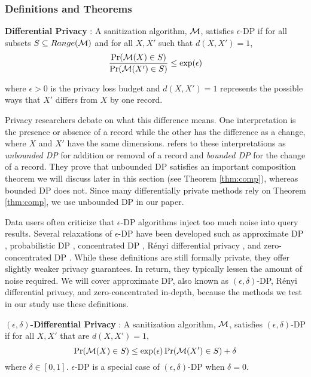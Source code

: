 \subsubsection{Definitions and Theorems}\label{subsec:def}
\begin{defn}\label{def:dp} \textbf{Differential Privacy} \autocite{dwork2006calibrating}:
A sanitization algorithm, $\mathcal{M}$, satisfies $\epsilon$-DP if for all subsets $S\subseteq Range(\mathcal{M})$ and for all $X,X'$ such that $d(X,X')=1$, 
    \begin{equation}\label{eqn:dp}
        \frac{\Pr(\mathcal{M}( X) \in S)}{ \Pr(\mathcal{M}( X')\in S)}\le \exp(\epsilon)
    \end{equation}
\end{defn}
\noindent where $\epsilon>0$ is the privacy loss budget and $d(X,X')=1$ represents the possible ways that $X'$ differs from $X$ by one record.

Privacy researchers debate on what this difference means. One interpretation is the presence or absence of a record while the other has the difference as a change, where $X$ and $X'$ have the same dimensions. \cite{li2016differential} refers to these interpretations as \textit{unbounded DP} for addition or removal of a record and \textit{bounded DP} for the change of a record. They prove that unbounded DP satisfies an important composition theorem we will discuss later in this section (see Theorem \ref{thm:comp}), whereas bounded DP does not. Since many differentially private methods rely on Theorem \ref{thm:comp}, we use unbounded DP in our paper.

Data users often criticize that $\epsilon$-DP algorithms inject too much noise into query results. Several relaxations of $\epsilon$-DP have been developed such as approximate DP \autocite{dwork2006our}, probabilistic DP \autocite{machanavajjhala2008privacy}, concentrated DP \autocite{dwork2016concentrated}, R\'enyi differential privacy \autocite{mironov2017renyi}, and zero-concentrated DP \autocite{bun2016concentrated}. While these definitions are still formally private, they offer slightly weaker privacy guarantees. In return, they typically lessen the amount of noise required. We will cover approximate DP, also known as $(\epsilon, \delta)$-DP, R\'enyi differential privacy, and zero-concentrated in-depth, because the methods we test in our study use these definitions.

\begin{defn}\label{def:adp} \textbf{$(\epsilon, \delta)$-Differential Privacy} \autocite{dwork2006our}:
A sanitization algorithm, $\mathcal{M}$, satisfies $(\epsilon, \delta)$-DP if for all $X, X'$ that are $d(X,X')=1$,
    \begin{equation}\label{eqn:adp}
        \Pr(\mathcal{M}( X) \in S)\le \exp(\epsilon) \Pr(\mathcal{M}( X')\in S) + \delta
    \end{equation}
    where $\delta\in [0,1]$. $\epsilon$-DP is a special case of $(\epsilon, \delta)$-DP when $\delta=0$.
\end{defn}

